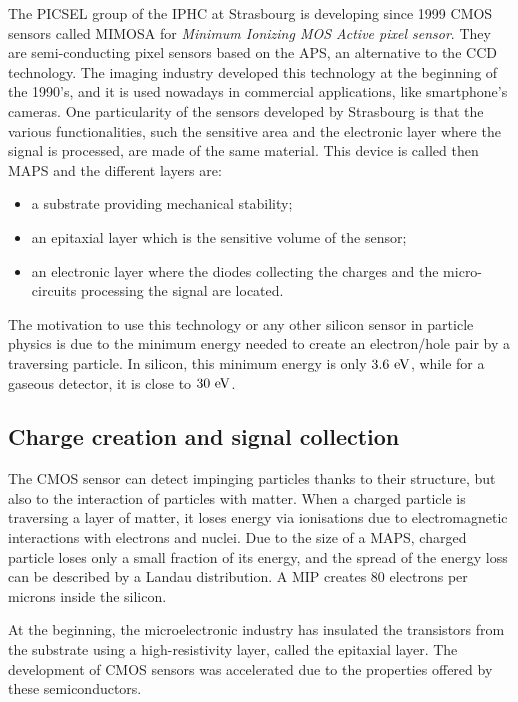   The PICSEL group of the IPHC at Strasbourg is developing since 1999 CMOS sensors called MIMOSA for \textit{Minimum Ionizing MOS Active pixel sensor}. 
  They are semi-conducting pixel sensors based on the \gls{APS}, an alternative to the \gls{CCD} technology.
  The imaging industry developed this technology at the beginning of the 1990's, and it is used nowadays in commercial applications, like smartphone's cameras.
  One particularity of the sensors developed by Strasbourg is that the various functionalities, such the sensitive area and the electronic layer where the signal is processed, are made of the same material.
  This device is called then \acrfull{MAPS} and the different layers are:
  \begin{itemize}
    \item a substrate providing mechanical stability;
    \item an epitaxial layer which is the sensitive volume of the sensor;
    \item an electronic layer where the diodes collecting the charges and the micro-circuits processing the signal are located.
  \end{itemize}

  The motivation to use this technology or any other silicon sensor in particle physics is due to the minimum energy needed to create an electron/hole pair by a traversing particle.
  In silicon, this minimum energy is only $3.6~\rm{eV}$, while for a gaseous detector, it is close to $30~\rm{eV}$.

    \subsection{Charge creation and signal collection}   

    The \gls{CMOS} sensor can detect impinging particles thanks to their structure, but also to the interaction of particles with matter.
    When a charged particle is traversing a layer of matter, it loses energy via ionisations due to electromagnetic interactions with electrons and nuclei.
    Due to the size of a \gls{MAPS}, charged particle loses only a small fraction of its energy, and the spread of the energy loss can be described by a Landau distribution.
    A \gls{MIP} creates 80 electrons per microns inside the silicon.

    At the beginning, the microelectronic industry has insulated the transistors from the substrate using a high-resistivity layer, called the epitaxial layer.
    The development of \gls{CMOS} sensors was accelerated due to the properties offered by these semiconductors.
    
